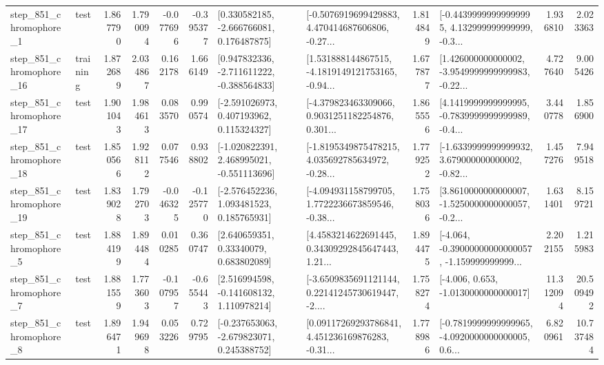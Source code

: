 \begin{tabular}{llrrrrllrlrr}
   step\_851\_chromophore\_1 &      test &      1.867790 &    1.790094 &     -0.077696 & -0.395377 &    [0.330582185, -2.666766081, 0.176487875] &  [-0.5076919699429883, 4.470414687606806, -0.27... &       1.814849 &  [-0.44399999999999995, 4.132999999999999, -0.3... &            1.936810 &          2.023363 \\
  step\_851\_chromophore\_16 &  training &      1.872689 &    2.034867 &      0.162178 &  1.666149 &   [0.947832336, -2.711611222, -0.388564833] &  [1.531888144867515, -4.1819149121753165, -0.94... &       1.677877 &  [1.426000000000002, -3.9549999999999983, -0.22... &            4.727640 &          9.005426 \\
  step\_851\_chromophore\_17 &      test &      1.901043 &    1.984613 &      0.083570 &  0.990574 &    [-2.591026973, 0.407193962, 0.115324327] &  [-4.379823463309066, 0.9031251182254876, 0.301... &       1.865556 &  [4.1419999999999995, -0.7839999999999989, -0.4... &            3.440778 &          1.856900 \\
  step\_851\_chromophore\_18 &      test &      1.850566 &    1.928112 &      0.077546 &  0.938802 &   [-1.020822391, 2.468995021, -0.551113696] &  [-1.8195349875478215, 4.035692785634972, -0.28... &       1.779252 &  [-1.6339999999999932, 3.679000000000002, -0.82... &            1.457276 &          7.949518 \\
  step\_851\_chromophore\_19 &      test &      1.839028 &    1.792703 &     -0.046325 & -0.125770 &    [-2.576452236, 1.093481523, 0.185765931] &  [-4.094931158799705, 1.7722236673859546, -0.38... &       1.758036 &  [3.8610000000000007, -1.5250000000000057, -0.2... &            1.631401 &          8.159721 \\
   step\_851\_chromophore\_5 &      test &      1.884199 &    1.894484 &      0.010285 &  0.360747 &      [2.640659351, 0.33340079, 0.683802089] &  [4.4583214622691445, 0.34309292845647443, 1.21... &       1.894475 &  [-4.064, -0.39000000000000057, -1.159999999999... &            2.202155 &          1.215983 \\
   step\_851\_chromophore\_7 &      test &      1.881559 &    1.773603 &     -0.107957 & -0.655443 &    [2.516994598, -0.141608132, 1.110978214] &  [-3.6509835691121144, 0.22141245730619447, -2.... &       1.758274 &               [-4.006, 0.653, -1.0130000000000017] &           11.312094 &         20.509492 \\
   step\_851\_chromophore\_8 &      test &      1.896471 &    1.949698 &      0.053226 &  0.729795 &   [-0.237653063, -2.679823071, 0.245388752] &  [0.09117269293786841, 4.451236169876283, -0.31... &       1.778986 &  [-0.7819999999999965, -4.0920000000000005, 0.6... &            6.820961 &         10.737484 \\

\end{tabular}
